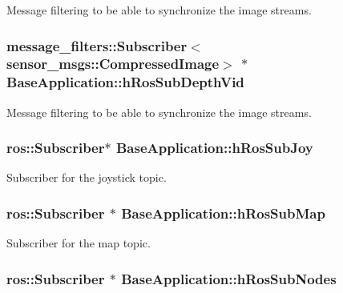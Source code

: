 \-Message filtering to be able to synchronize the image streams. \hypertarget{classBaseApplication_aa867681d76ee90600daaa741dbdc146d}{
\subsubsection[{h\-Ros\-Sub\-Depth\-Vid}]{\setlength{\rightskip}{0pt plus 5cm}message\-\_\-filters\-::\-Subscriber$<$sensor\-\_\-msgs\-::\-Compressed\-Image$>$ $\ast$ {\bf \-Base\-Application\-::h\-Ros\-Sub\-Depth\-Vid}}}\label{classBaseApplication_aa867681d76ee90600daaa741dbdc146d}
\-Message filtering to be able to synchronize the image streams. \hypertarget{classBaseApplication_ad5628cfeba6fec0ad0cc5b7df4bdbf78}{
\subsubsection[{h\-Ros\-Sub\-Joy}]{\setlength{\rightskip}{0pt plus 5cm}ros\-::\-Subscriber$\ast$ {\bf \-Base\-Application\-::h\-Ros\-Sub\-Joy}}}\label{classBaseApplication_ad5628cfeba6fec0ad0cc5b7df4bdbf78}
\-Subscriber for the joystick topic. \hypertarget{classBaseApplication_a29e8c4acc87f2e63a6d8d360468b56a6}{
\subsubsection[{h\-Ros\-Sub\-Map}]{\setlength{\rightskip}{0pt plus 5cm}ros\-::\-Subscriber $\ast$ {\bf \-Base\-Application\-::h\-Ros\-Sub\-Map}}}\label{classBaseApplication_a29e8c4acc87f2e63a6d8d360468b56a6}
\-Subscriber for the map topic. \hypertarget{classBaseApplication_a92ef2e57f67f525b9910151619f92f37}{
\subsubsection[{h\-Ros\-Sub\-Nodes}]{\setlength{\rightskip}{0pt plus 5cm}ros\-::\-Subscriber $\ast$ {\bf \-Base\-Application\-::h\-Ros\-Sub\-Nodes}}}\label{classBaseApplication_a92ef2e57f67f525b9910151619f92f37}
